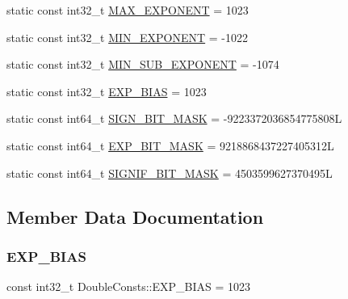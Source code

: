 \begin{DoxyCompactItemize}
static const int32\+\_\+t \mbox{\hyperlink{classlucene_1_1core_1_1util_1_1numeric_1_1DoubleConsts_a788bb598d330d97a3c3ed0a7b7aa6806}{M\+A\+X\+\_\+\+E\+X\+P\+O\+N\+E\+NT}} = 1023
\item 
static const int32\+\_\+t \mbox{\hyperlink{classlucene_1_1core_1_1util_1_1numeric_1_1DoubleConsts_ac06173f71bc53baa1bd48339c4f51e7b}{M\+I\+N\+\_\+\+E\+X\+P\+O\+N\+E\+NT}} = -\/1022
\item 
static const int32\+\_\+t \mbox{\hyperlink{classlucene_1_1core_1_1util_1_1numeric_1_1DoubleConsts_ab114119218bfbc1ba0284d34193b2056}{M\+I\+N\+\_\+\+S\+U\+B\+\_\+\+E\+X\+P\+O\+N\+E\+NT}} = -\/1074
\item 
static const int32\+\_\+t \mbox{\hyperlink{classlucene_1_1core_1_1util_1_1numeric_1_1DoubleConsts_a0b377d2d6fbbc2c49834222e8f627aa6}{E\+X\+P\+\_\+\+B\+I\+AS}} = 1023
\item 
static const int64\+\_\+t \mbox{\hyperlink{classlucene_1_1core_1_1util_1_1numeric_1_1DoubleConsts_ad5402d786e30e634a27fa5463dcd6d7f}{S\+I\+G\+N\+\_\+\+B\+I\+T\+\_\+\+M\+A\+SK}} = -\/9223372036854775808L
\item 
static const int64\+\_\+t \mbox{\hyperlink{classlucene_1_1core_1_1util_1_1numeric_1_1DoubleConsts_a112ccf516b95834fd93b1f94b77d23b5}{E\+X\+P\+\_\+\+B\+I\+T\+\_\+\+M\+A\+SK}} = 9218868437227405312L
\item 
static const int64\+\_\+t \mbox{\hyperlink{classlucene_1_1core_1_1util_1_1numeric_1_1DoubleConsts_afdddc1e65c90d6e61cd798aea7e26735}{S\+I\+G\+N\+I\+F\+\_\+\+B\+I\+T\+\_\+\+M\+A\+SK}} = 4503599627370495L
\end{DoxyCompactItemize}


\subsection{Member Data Documentation}
\mbox{\label{classlucene_1_1core_1_1util_1_1numeric_1_1DoubleConsts_a0b377d2d6fbbc2c49834222e8f627aa6}} 
\subsubsection{\texorpdfstring{E\+X\+P\+\_\+\+B\+I\+AS}{EXP\_BIAS}}
{\footnotesize\ttfamily const int32\+\_\+t Double\+Consts\+::\+E\+X\+P\+\_\+\+B\+I\+AS = 1023\hspace{0.3cm}{\ttfamily [static]}}

